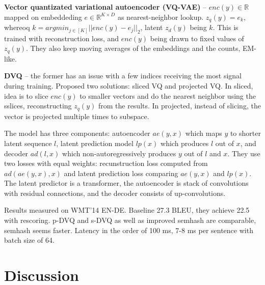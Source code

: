 \textbf{Vector quantizated variational autoencoder (VQ-VAE)} --
$enc(y)\in\mathbb{R}$ mapped on embeddeding $e\in\mathbb{R}^{K\times D}$ as
nearest-neighbor lookup. $z_q(y) = e_k$, whereoq
$k = argmin_{j\in[K]} || enc(y) - e_j ||_2$, latent $z_d(y)$ being $k$. This is
trained with reconstruction loss, and $enc(y)$ being drawn to fixed values of
$z_q(y)$. They also keep moving averages of the embeddings and the counts,
EM-like.

\textbf{DVQ} -- the former has an issue with a few indices receiving the most signal
during training. Proposed two solutions: sliced VQ and projected VQ. In sliced,
idea is to slice $enc(y)$ to smaller vectors and do the nearest neighbor using
the sslices, reconstructing $z_q(y)$ from the results. In projected, instead of
slicing, the vector is projected multiple times to subspace.

The model has three components: autoencoder $ae(y, x)$ which maps $y$ to shorter
latent sequence $l$, latent prediction model $lp(x)$ which produces $l$ out of
$x$, and decoder $ad(l, x)$ which non-autoregressively produces $y$ out of $l$
and $x$. They use two losses with equal weights: recunstruction loss computed
from $ad(ae(y,x),x)$ and latent prediction loss comparing $ae(y,x)$ and $lp(x)$.
The latent predictor is a transformer, the autoencoder is stack of convolutions
with residual connections, and the decoder consists of up-convolutions.

Results measured on WMT'14 EN-DE. Baseline 27.3 BLEU, they achieve 22.5 with
rescoring. p-DVQ and s-DVQ as well as improved semhash are comparable, semhash
seems faster. Latency in the order of 100 ms, 7-8 ms per sentence with batch
size of 64.

\section{Discussion}%
\label{sec:nat:discussion}



